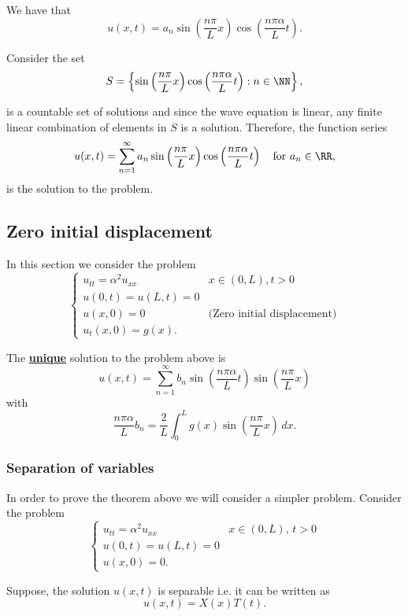 \documentclass[12pt, a4paper]{article}
\begin{document}
We have that 
\[u(x,t) = a_n \sin \left( \frac{n\pi}{L}x \right)\cos\left( \frac{n\pi\alpha}{L} t\right).\]

Consider the set 
\[S = \left\{ \sin \left( \frac{n\pi}{L}x \right) \cos\left( \frac{n\pi\alpha}{L} t\right) : n \in \NN \right\},\]

is a countable set of solutions and since the wave equation is linear, any finite linear combination of elements in \(S\) is a solution. Therefore, the function series 
\[u(x,t) = \sum_{n=1}^{\infty} a_n \sin \left( \frac{n\pi}{L}x \right) \cos\left( \frac{n\pi\alpha}{L} t\right) \quad \text{for } a_n \in \RR,\]
is the solution to the problem.

\subsection{Zero initial displacement}

In this section we consider the problem 
\[\begin{cases}
    u_{tt} = \alpha^2 u_{xx} & x\in(0,L), t>0 \\
    u(0,t)=u(L,t)=0 \\
    u(x,0)=0 &\text{(Zero initial displacement)} \\
    u_t(x,0)=g(x).
\end{cases}\]

\begin{mdthm}
    The \underline{\textbf{unique}} solution to the problem above is 
    \[u(x,t) = \sum_{n=1}^{\infty} b_n \sin\left( \frac{n\pi \alpha}{L}t \right)\sin\left( \frac{n\pi}{L}x \right)\] 
    with 
    \[\frac{n\pi \alpha}{L}b_n = \frac{2}{L} \int_{0}^L g(x) \sin \left( \frac{n\pi}{L}x \right) \, dx.\]
\end{mdthm}

\subsubsection{Separation of variables}

In order to prove the theorem above we will consider a simpler problem. Consider the problem 
\[\begin{cases}
    u_{tt}=\alpha^2 u_{xx} &x\in(0,L), \, t>0 \\
    u(0,t)=u(L,t)=0 \\
    u(x,0)=0.
\end{cases}\]

Suppose, the solution \(u(x,t)\) is separable i.e. it can be written as 
\[u(x,t)=X(x)T(t).\]
\end{document}
